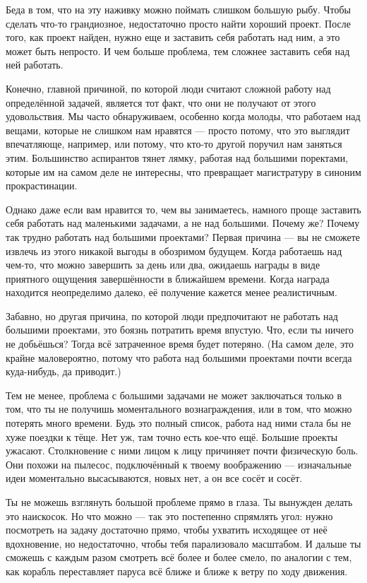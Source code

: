 \documentclass[ebook,12pt,oneside,openany]{memoir}
\begin{document}
Беда в том, что на эту наживку можно поймать слишком большую рыбу.
Чтобы сделать что-то грандиозное, недостаточно просто найти хороший
проект. После того, как проект найден, нужно еще и заставить себя
работать над ним, а это может быть непросто. И чем больше проблема,
тем сложнее заставить себя над ней работать.

Конечно, главной причиной, по которой люди считают сложной работу над
определённой задачей, является тот факт, что они не получают от этого
удовольствия. Мы часто обнаруживаем, особенно когда молоды, что
работаем над вещами, которые не слишком нам нравятся — просто потому,
что это выглядит впечатляюще, например, или потому, что кто-то другой
поручил нам заняться этим. Большинство аспирантов тянет лямку, работая
над большими поректами, которые им на самом деле не интересны, что
превращает магистратуру в синоним прокрастинации.

Однако даже если вам нравится то, чем вы занимаетесь, намного проще
заставить себя работать над маленькими задачами, а не над большими.
Почему же? Почему так трудно работать над большими проектами? Первая
причина — вы не сможете извлечь из этого никакой выгоды в обозримом
будущем. Когда работаешь над чем-то, что можно завершить за день или
два, ожидаешь награды в виде приятного ощущения завершённости в
ближайшем времени. Когда награда находится неопределимо далеко, её
получение кажется менее реалистичным.

Забавно, но другая причина, по которой люди предпочитают не работать
над большими проектами, это боязнь потратить время впустую. Что, если
ты ничего не добьёшься? Тогда всё затраченное время будет потеряно.
(На самом деле, это крайне маловероятно, потому что работа над
большими проектами почти всегда куда-нибудь, да приводит.)

Тем не менее, проблема с большими задачами не может заключаться только
в том, что ты не получишь моментального вознаграждения, или в том, что
можно потерять много времени. Будь это полный список, работа над ними
стала бы не хуже поездки к тёще. Нет уж, там точно есть кое-что ещё.
Большие проекты ужасают. Столкновение с ними лицом к лицу причиняет
почти физическую боль. Они похожи на пылесос, подключённый к твоему
воображению — изначальные идеи моментально высасываются, новых нет, а
он все сосёт и сосёт.

Ты не можешь взглянуть большой проблеме прямо в глаза. Ты вынужден
делать это наискосок. Но что можно — так это постепенно спрямлять
угол: нужно посмотреть на задачу достаточно прямо, чтобы ухватить
исходящее от неё вдохновение, но недостаточно, чтобы тебя парализовало
масштабом. И дальше ты сможешь с каждым разом смотреть всё более и
более смело, по аналогии с тем, как корабль переставляет паруса всё
ближе и ближе к ветру по ходу движения.
\end{document}
